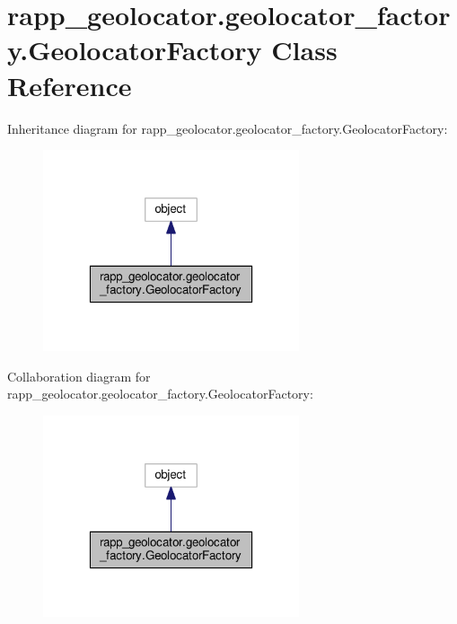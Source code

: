 \hypertarget{classrapp__geolocator_1_1geolocator__factory_1_1GeolocatorFactory}{\section{rapp\-\_\-geolocator.\-geolocator\-\_\-factory.\-Geolocator\-Factory Class Reference}
\label{classrapp__geolocator_1_1geolocator__factory_1_1GeolocatorFactory}
}


Inheritance diagram for rapp\-\_\-geolocator.\-geolocator\-\_\-factory.\-Geolocator\-Factory\-:
\nopagebreak
\begin{figure}[H]
\begin{center}
\leavevmode
\includegraphics[width=214pt]{classrapp__geolocator_1_1geolocator__factory_1_1GeolocatorFactory__inherit__graph}
\end{center}
\end{figure}


Collaboration diagram for rapp\-\_\-geolocator.\-geolocator\-\_\-factory.\-Geolocator\-Factory\-:
\nopagebreak
\begin{figure}[H]
\begin{center}
\leavevmode
\includegraphics[width=214pt]{classrapp__geolocator_1_1geolocator__factory_1_1GeolocatorFactory__coll__graph}
\end{center}
\end{figure}
